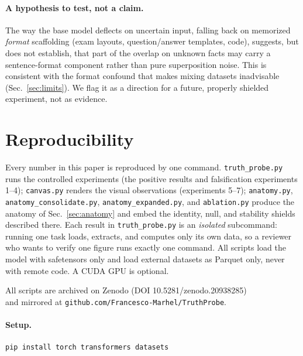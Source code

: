 \documentclass[11pt]{article}
\begin{document}
\paragraph{A hypothesis to test, not a claim.} The way the base model
deflects on uncertain input, falling back on memorized \emph{format}
scaffolding (exam layouts, question/answer templates, code), suggests, but
does not establish, that part of the overlap on unknown facts may carry a
sentence-format component rather than pure superposition noise. This is
consistent with the format confound that makes mixing datasets inadvisable
(Sec.~\ref{sec:limits}). We flag it as a direction for a future, properly
shielded experiment, not as evidence.

\section{Reproducibility}
\label{sec:repro}

Every number in this paper is reproduced by one command. \texttt{truth\_probe.py}
runs the controlled experiments (the positive results and falsification
experiments 1--4); \texttt{canvas.py} renders the visual observations
(experiments 5--7); \texttt{anatomy.py}, \texttt{anatomy\_consolidate.py},
\texttt{anatomy\_expanded.py}, and \texttt{ablation.py} produce the anatomy of
Sec.~\ref{sec:anatomy} and embed the identity, null, and stability shields
described there. Each result in \texttt{truth\_probe.py} is an \emph{isolated}
subcommand: running one task loads, extracts, and computes only its own data,
so a reviewer who wants to verify one figure runs exactly one command. All
scripts load the model with safetensors only and load external datasets as
Parquet only, never with remote code. A CUDA GPU is optional.

All scripts are archived on Zenodo (DOI 10.5281/zenodo.20938285) \\ and  mirrored
at \texttt{github.com/Francesco-Marhel/TruthProbe}.

\paragraph{Setup.}
\begin{verbatim}
pip install torch transformers datasets
\end{verbatim}
\end{document}
